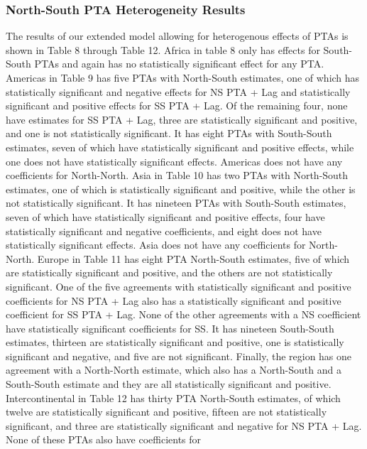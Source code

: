 \documentclass[12pt]{article}%
\begin{document}
\subsubsection{North{-}South PTA Heterogeneity Results}%
\label{ssubsec:North{-}SouthPTAHeterogeneityResults}%
The results of our extended model allowing for heterogenous effects of
PTAs is shown in Table 8 through Table 12. Africa in table 8 only has
effects for South-South PTAs and again has no statistically significant
effect for any PTA. Americas in Table 9 has five PTAs with North-South
estimates, one of which has statistically significant and negative
effects for NS PTA + Lag and statistically significant and positive
effects for SS PTA + Lag. Of the remaining four, none have estimates for
SS PTA + Lag, three are statistically significant and positive, and one
is not statistically significant. It has eight PTAs with South-South
estimates, seven of which have statistically significant and positive
effects, while one does not have statistically significant effects.
Americas does not have any coefficients for North-North. Asia in Table
10 has two PTAs with North-South estimates, one of which is
statistically significant and positive, while the other is not
statistically significant. It has nineteen PTAs with South-South
estimates, seven of which have statistically significant and positive
effects, four have statistically significant and negative coefficients,
and eight does not have statistically significant effects. Asia does not
have any coefficients for North-North. Europe in Table 11 has eight PTA
North-South estimates, five of which are statistically significant and
positive, and the others are not statistically significant. One of the
five agreements with statistically significant and positive coefficients
for NS PTA + Lag also has a statistically significant and positive
coefficient for SS PTA + Lag. None of the other agreements with a NS
coefficient have statistically significant coefficients for SS. It has
nineteen South-South estimates, thirteen are statistically significant
and positive, one is statistically significant and negative, and five
are not significant. Finally, the region has one agreement with a
North-North estimate, which also has a North-South and a South-South
estimate and they are all statistically significant and positive.
Intercontinental in Table 12 has thirty PTA North-South estimates, of
which twelve are statistically significant and positive, fifteen are not
statistically significant, and three are statistically significant and
negative for NS PTA + Lag. None of these PTAs also have coefficients for
\end{document}
